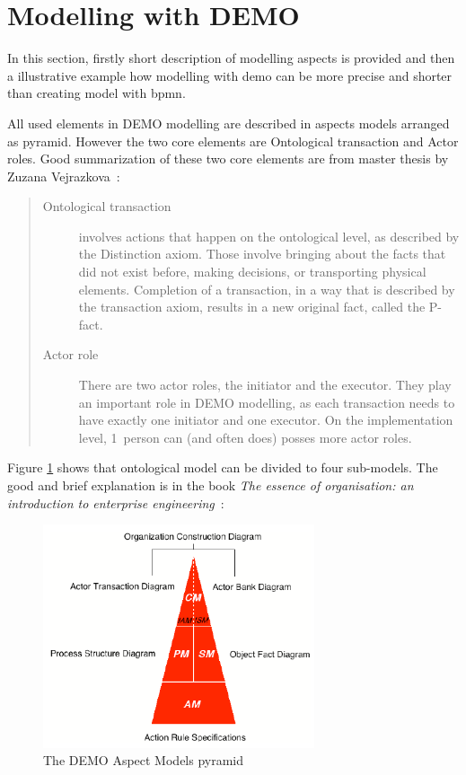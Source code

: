 \section{Modelling with DEMO}
In this section, firstly short description of modelling aspects is provided and then a illustrative example how modelling with \gls{demo} can be more precise and shorter than creating model with \gls{bpmn}. 

All used elements in DEMO modelling are described in aspects models arranged as pyramid. However the two core elements are Ontological transaction and Actor roles. Good summarization of these two core elements are from master thesis by Zuzana Vejrazkova~\cite{vejrazkova-demo-2013}:

\begin{quote}
	\begin{description}
		\item[Ontological transaction] involves actions that happen on the ontological level, as described by the Distinction axiom. Those involve bringing about the facts that did not exist before, making decisions, or transporting physical elements. Completion of a transaction, in a way that is described by the transaction axiom, results in a new original fact, called the P-fact.
        \item[Actor role] There are two actor roles, the initiator and the executor. They play an important role in DEMO modelling, as each transaction needs to have exactly one initiator and one executor. On the implementation level, 1~person can (and often does) posses more actor roles.
	\end{description}
\end{quote}

Figure \ref{fig:DemoAspectModels} shows that ontological model can be divided to four sub-models. The good and brief explanation is in the book \textit{The essence of organisation: an introduction to enterprise engineering}~\cite{dietz-essence-2015}:

\begin{figure}[ht!]
	\centering
    \includegraphics[width=8cm, keepaspectratio]{img/DemoAspectModels}
    \caption{The DEMO Aspect Models pyramid\cite{dietz-discipline-2013}}
    \label{fig:DemoAspectModels}
\end{figure}


